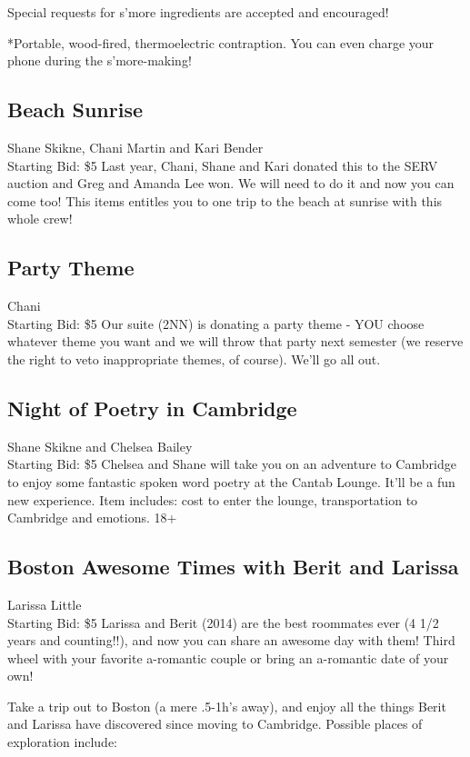 \documentclass[11pt]{article}
\begin{document}
Special requests for s'more ingredients are accepted and encouraged!

*Portable, wood-fired, thermoelectric contraption. You can even charge your phone during the s'more-making!
\subsection{Beach Sunrise}
Shane Skikne, Chani  Martin and Kari Bender
\\
Starting Bid: \$5
\newline
Last year, Chani, Shane and Kari donated this to the SERV auction and Greg and Amanda Lee won. We will need to do it and now you can come too! This items entitles you to one trip to the beach at sunrise with this whole crew!
\subsection{Party Theme}
Chani
\\
Starting Bid: \$5
\newline
Our suite (2NN) is donating a party theme - YOU choose whatever theme you want and we will throw that party next semester (we reserve the right to veto inappropriate themes, of course).  We'll go all out.
\subsection{Night of Poetry in Cambridge}
Shane Skikne and Chelsea Bailey
\\
Starting Bid: \$5
\newline
Chelsea and Shane will take you on an adventure to Cambridge to enjoy some fantastic spoken word poetry at the Cantab Lounge. It'll be a fun new experience. Item includes: cost to enter the lounge, transportation to Cambridge and emotions.  
  18+
\subsection{Boston Awesome Times with Berit and Larissa}
Larissa Little
\\
Starting Bid: \$5
\newline
Larissa and Berit (2014) are the best roommates ever (4 1/2 years and counting!!), and now you can share an awesome day with them! Third wheel with your favorite a-romantic couple or bring an a-romantic date of your own!

Take a trip out to Boston (a mere .5-1h's away), and enjoy all the things Berit and Larissa have discovered since moving to Cambridge. Possible places of exploration include:
\end{document}

